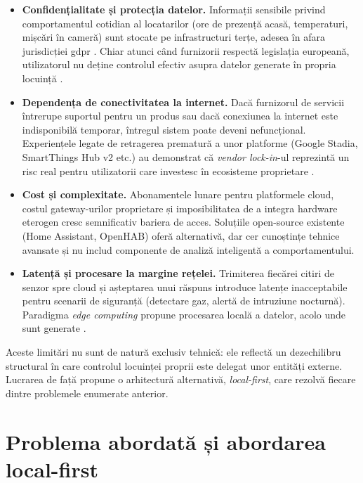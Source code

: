 \begin{itemize}
  \item \textbf{Confidențialitate și protecția datelor.}
  Informații sensibile privind comportamentul cotidian al locatarilor
  (ore de prezență acasă, temperaturi, mișcări în cameră) sunt stocate
  pe infrastructuri terțe, adesea în afara jurisdicției \gls{gdpr}
  \cite{zheng2018smarthomeprivacy,gdpr2016}.
  Chiar atunci când furnizorii respectă legislația europeană, utilizatorul
  nu deține controlul efectiv asupra datelor generate în propria locuință
  \cite{alrawi2019sokhome}.

  \item \textbf{Dependența de conectivitatea la internet.}
  Dacă furnizorul de servicii întrerupe suportul pentru un produs sau dacă
  conexiunea la internet este indisponibilă temporar, întregul sistem poate
  deveni nefuncțional. Experiențele legate de retragerea prematură a unor
  platforme (Google Stadia, SmartThings Hub v2 etc.) au demonstrat că
  \emph{vendor lock-in}-ul reprezintă un risc real pentru utilizatorii care
  investesc în ecosisteme proprietare \cite{kleppmann2019localfirst}.

  \item \textbf{Cost și complexitate.}
  Abonamentele lunare pentru platformele cloud, costul gateway-urilor
  proprietare și imposibilitatea de a integra hardware eterogen cresc
  semnificativ bariera de acces. Soluțiile open-source existente (Home
  Assistant, OpenHAB) oferă alternativă, dar cer cunoștințe tehnice
  avansate și nu includ componente de analiză inteligentă a comportamentului.

  \item \textbf{Latență și procesare la margine rețelei.}
  Trimiterea fiecărei citiri de senzor spre cloud și așteptarea unui răspuns
  introduce latențe inacceptabile pentru scenarii de siguranță (detectare gaz,
  alertă de intruziune nocturnă). Paradigma \emph{edge computing} propune
  procesarea locală a datelor, acolo unde sunt generate
  \cite{shi2016edge}.
\end{itemize}

Aceste limitări nu sunt de natură exclusiv tehnică: ele reflectă un dezechilibru
structural în care controlul locuinței proprii este delegat unor entități externe.
Lucrarea de față propune o arhitectură alternativă, \emph{local-first}, care
rezolvă fiecare dintre problemele enumerate anterior.

\section{Problema abordată și abordarea local-first}
\label{sec:problema}

